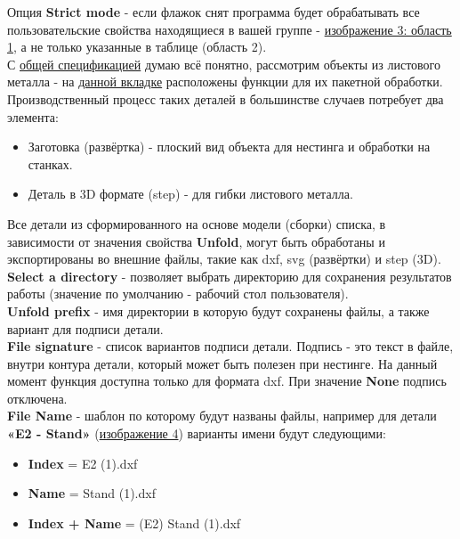 \documentclass[a4paper,12pt]{article}
\begin{document}
Опция \textbf{Strict mode} - если флажок снят программа будет обрабатывать все пользовательские свойства находящиеся в вашей группе - \hyperref[sec:pref_specification]{изображение 3: область 1}, а не только указанные в таблице (область 2).\\

С \hyperref[sec:specification_all]{общей спецификацией} думаю всё понятно, рассмотрим объекты из листового металла - на \hyperref[sec:specification_sm]{данной вкладке} расположены функции для их пакетной обработки. Производственный процесс таких деталей в большинстве случаев потребует два элемента:

\begin{itemize}
	\item Заготовка (развёртка) - плоский вид объекта для нестинга и обработки на станках.
	\item Деталь в 3D формате (step) - для гибки листового металла.
\end{itemize}

Все детали из сформированного на основе модели (сборки) списка, в зависимости от значения свойства \textbf{Unfold}, могут быть обработаны и экспортированы во внешние файлы, такие как dxf, svg (развёртки) и step (3D).\\

\textbf{Select a directory} - позволяет выбрать директорию для сохранения результатов работы (значение по умолчанию - рабочий стол пользователя).\\

\textbf{Unfold prefix} - имя директории в которую будут сохранены файлы, а также вариант для подписи детали.\\

\textbf{File signature} - список вариантов подписи детали. Подпись - это текст в файле, внутри контура детали, который может быть полезен при нестинге. На данный момент функция доступна только для формата dxf. При значение \textbf{None} подпись отключена.\\

\textbf{File Name} - шаблон по которому будут названы файлы, например для детали \textbf{«E2 - Stand»} (\hyperref[sec:properties]{изображение 4}) варианты имени будут следующими:

\begin{itemize}
	\item \textbf{Index} = E2 (1).dxf
	\item \textbf{Name} = Stand (1).dxf
	\item \textbf{Index + Name} = (E2) Stand (1).dxf
\end{itemize}
\end{document}
